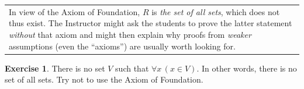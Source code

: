 \documentclass[12pt,notitlepage]{article}
\theoremstyle{plain}
\theoremstyle{definition}
\newtheorem{exc}[thm]{Exercise}
\theoremstyle{plain}
\newcommand{\1}{\mathbf{1}}
\newcommand{\0}{\mathbf{0}}
\newcommand{\mcomm}[1]{
\medskip\noindent\begin{tabular}{| l}
\parbox{0.99\textwidth}{{\small
#1 }}\end{tabular}
\smallskip}
\begin{document}
\mcomm{In view of the Axiom of Foundation, $R$ is \emph{the set of all sets}, which does not thus exist. The Instructor might ask the students to prove the latter statement \emph{without} that axiom and might then explain why proofs from \emph{weaker} assumptions (even the ``axioms'') are usually worth looking for.}
\begin{exc}
There is no set $V$ such that
$\forall x\, (x \in V).$
In other words, there is no set of all sets. Try not to use the Axiom of Foundation.
\end{exc}
%
\end{document}

